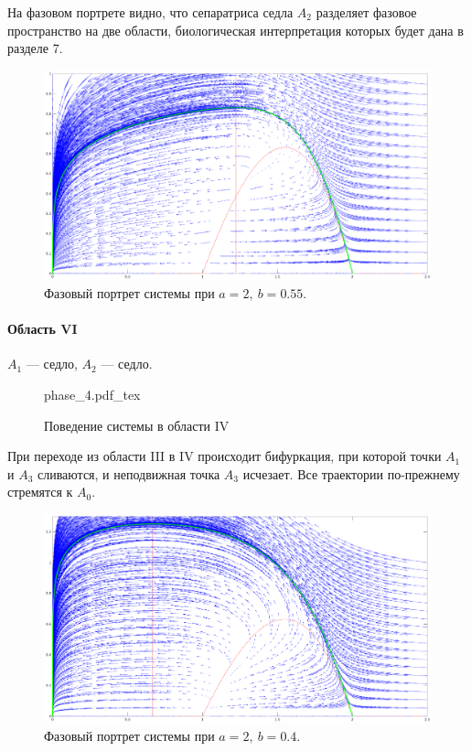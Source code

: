 \documentclass[16pt]{article}
\newcommand{\incfig}[2]{%
    \def\svgwidth{#2 mm}
    {#1.pdf_tex}
}
\newcommand\Pict[3]{
\begin{figure}[h!]
    \centering
    \incfig{#1}{#3}
    \caption{#2}
    \label{fig:#1}
\end{figure}
}
\begin{document}
На фазовом портрете видно, что сепаратриса седла $A_2$ разделяет фазовое пространство на две области, биологическая
интерпретация которых будет дана в разделе 7. 

\begin{figure}[h]
\begin{center}
\includegraphics[width=160mm]{ph3.eps}
\caption{Фазовый портрет системы при $a = 2, \ b = 0.55$.}
\end{center}
\end{figure}
\newpage

\newpage
\paragraph{Область VI} $A_1$ --- седло, $A_2$  --- седло.
\Pict{phase_4}{Поведение системы в области IV}{70}

При переходе из области III в IV происходит бифуркация, при которой точки $A_1$ и $A_3$ сливаются, и неподвижная
точка $A_3$ исчезает. Все траектории по-прежнему стремятся к $A_0$.

\begin{figure}[h]
\begin{center}
\includegraphics[width=160mm]{ph4.eps}
\caption{Фазовый портрет системы при $a = 2, \ b = 0.4$.}
\end{center}
\end{figure}
\newpage
\end{document}
